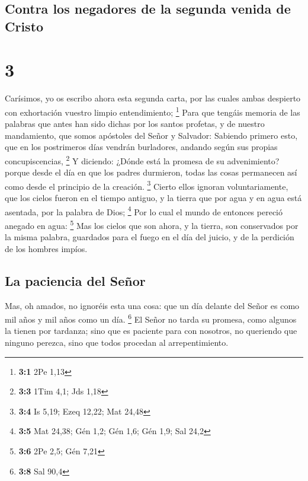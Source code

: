 \hypertarget{contra-los-negadores-de-la-segunda-venida-de-cristo}{%
\subsection{Contra los negadores de la segunda venida de
Cristo}\label{contra-los-negadores-de-la-segunda-venida-de-cristo}}

\hypertarget{section-2}{%
\section{3}\label{section-2}}

 Carísimos, yo os escribo ahora esta segunda carta, por las
cuales ambas despierto con exhortación vuestro limpio entendimiento;
\footnote{\textbf{3:1} 2Pe 1,13}  Para que tengáis memoria
de las palabras que antes han sido dichas por los santos profetas, y de
nuestro mandamiento, que somos apóstoles del Señor y Salvador:
 Sabiendo primero esto, que en los postrimeros días vendrán
burladores, andando según sus propias concupiscencias, \footnote{\textbf{3:3}
  1Tim 4,1; Jds 1,18}  Y diciendo: ¿Dónde está la promesa de
su advenimiento? porque desde el día en que los padres durmieron, todas
las cosas permanecen así como desde el principio de la creación.
\footnote{\textbf{3:4} Is 5,19; Ezeq 12,22; Mat 24,48} 
Cierto ellos ignoran voluntariamente, que los cielos fueron en el tiempo
antiguo, y la tierra que por agua y en agua está asentada, por la
palabra de Dios; \footnote{\textbf{3:5} Mat 24,38; Gén 1,2; Gén 1,6; Gén
  1,9; Sal 24,2}  Por lo cual el mundo de entonces pereció
anegado en agua: \footnote{\textbf{3:6} 2Pe 2,5; Gén 7,21} 
Mas los cielos que son ahora, y la tierra, son conservados por la misma
palabra, guardados para el fuego en el día del juicio, y de la perdición
de los hombres impíos.

\hypertarget{la-paciencia-del-seuxf1or}{%
\subsection{La paciencia del Señor}\label{la-paciencia-del-seuxf1or}}

 Mas, oh amados, no ignoréis esta una cosa: que un día
delante del Señor es como mil años y mil años como un día. \footnote{\textbf{3:8}
  Sal 90,4}  El Señor no tarda su promesa, como algunos la
tienen por tardanza; sino que es paciente para con nosotros, no
queriendo que ninguno perezca, sino que todos procedan al
arrepentimiento.


